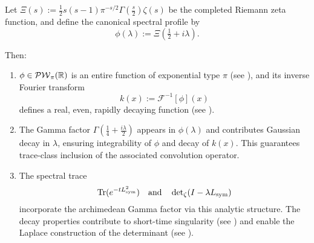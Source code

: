 \begin{lemma}
\label{lem:gamma_embedding_kernel_determinant}
Let \( \Xi(s) := \tfrac{1}{2} s(s-1) \pi^{-s/2} \Gamma\left(\tfrac{s}{2}\right) \zeta(s) \) be the completed Riemann zeta function, and define the canonical spectral profile by
\[
\phi(\lambda) := \Xi\left( \tfrac{1}{2} + i\lambda \right).
\]

Then:
\begin{enumerate}
  \item \( \phi \in \mathcal{PW}_{\pi}(\mathbb{R}) \) is an entire function of exponential type \( \pi \) (see ), and its inverse Fourier transform
  \[
  k(x) := \mathcal{F}^{-1}[\phi](x)
  \]
  defines a real, even, rapidly decaying function (see ).

  \item The Gamma factor \( \Gamma\left(\tfrac{1}{4} + \tfrac{i\lambda}{2} \right) \) appears in \( \phi(\lambda) \) and contributes Gaussian decay in \( \lambda \), ensuring integrability of \( \phi \) and decay of \( k(x) \). This guarantees trace-class inclusion of the associated convolution operator.

  \item The spectral trace
  \[
  \operatorname{Tr}(e^{-t L_{\mathrm{sym}}^2}) \quad \text{and} \quad \det\nolimits_{\zeta}(I - \lambda L_{\mathrm{sym}})
  \]
  incorporate the archimedean Gamma factor via this analytic structure. The decay properties contribute to short-time singularity (see ) and enable the Laplace construction of the determinant (see ).
\end{enumerate}
\end{lemma}
